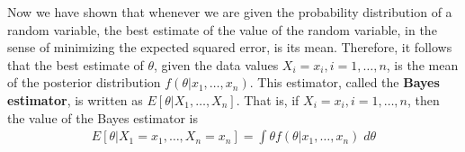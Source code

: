 \documentclass[12pt]{article}
\begin{document}
Now we have shown that whenever we are given the probability distribution of a random variable, the best estimate of the value of the random variable, in the sense of minimizing the expected squared error, is its mean. Therefore, it follows that the best estimate of $\theta$, given the data values $X_i = x_i, i= 1, \dots, n$, is the mean of the posterior distribution $f(\theta | x_1, \dots, x_n)$. This estimator, called the \textbf{Bayes estimator}, is written as $E[\theta | X_1, \dots, X_n]$. That is, if $X_i = x_i, i = 1, \dots, n$, then the value of the Bayes estimator is
\begin{eqnarray*}
  E[\theta | X_1 = x_1, \dots, X_n = x_n]
  = \int \theta f(\theta | x_1, \dots, x_n) \; d \theta
\end{eqnarray*}
\end{document}
